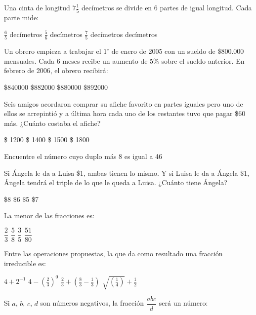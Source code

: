 \documentclass[10pt,letterpaper,addpoints]{exam}
\begin{document}
\begin{multicols}{2}
\begin{questions}
\question
Una cinta de longitud $7\frac{1}{5}$ dec\'imetros se divide en 6 partes de igual longitud. Cada parte mide:
\begin{choices}
\CorrectChoice $\frac{6}{5}$ dec\'imetros
\choice $\frac{5}{6}$ dec\'imetros
\choice $\frac{7}{5}$ dec\'imetros
 dec\'imetros
\end{choices}
\question
Un obrero empieza a trabajar el $1^\circ$ de enero de 2005 con un sueldo de \$800.000 mensuales. Cada 6 meses recibe un aumento de 5\% sobre el sueldo anterior. En febrero de 2006, el obrero recibirá:

\begin{choices}
\choice \$840000
\CorrectChoice \$882000
\choice \$880000
\choice \$892000
\end{choices}
\question Seis amigos acordaron comprar su afiche favorito en partes iguales pero uno de ellos se arrepintió y a última hora cada uno de los restantes tuvo que pagar \$60 más. ¿Cuánto costaba el afiche?
\begin{choices}
\choice \$ 1200
\choice \$ 1400
\choice \$ 1500
\CorrectChoice \$ 1800
\end{choices}
\question Encuentre el número cuyo duplo más 8 es igual a 46

\begin{oneparchoices}
\end{oneparchoices}
\question Si Ángela le da a Luisa \$1, ambas tienen lo mismo. Y si Luisa le da a Ángela \$1, Ángela tendrá el triple de lo que le queda a Luisa. ¿Cuánto tiene Ángela?

\begin{oneparchoices}
\choice \$8
\choice \$6
\CorrectChoice \$5
\choice \$7
\end{oneparchoices}
\question La menor de las fracciones es:

\begin{oneparchoices}
\choice $\dfrac{2}{3}$
\choice $\dfrac{5}{8}$
\CorrectChoice $\dfrac{3}{5}$
\choice $\dfrac{51}{80}$
\end{oneparchoices}
\question Entre las operaciones propuestas, la que da como resultado una fracción irreducible es:
\begin{choices}
\CorrectChoice $4+2^{-1}$
\choice $4-(\frac{2}{3})^{0}$
\choice $\frac{2}{3}+(\frac{8}{3}-\frac{1}{3})$
\choice $\sqrt{(\frac{1}{4})}+\frac{1}{2}$
\end{choices}
\question Si $a$, $b$, $c$, $d$ son números negativos, la fracción $\dfrac{abc}{d}$ será un número:


\end{questions}
\end{multicols}
\end{document}
